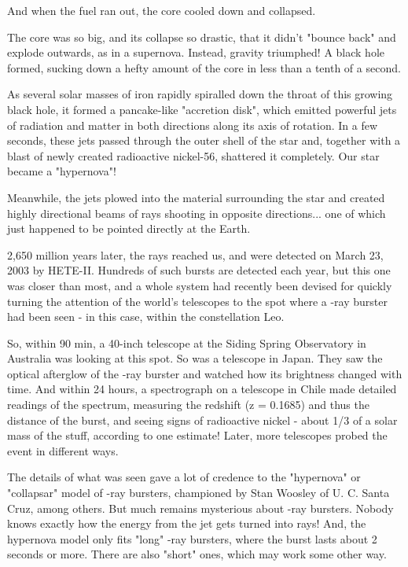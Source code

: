 And when the fuel ran out, the core cooled down and collapsed.  

The core was so big, and its collapse so drastic, that it didn't 
"bounce back" and explode outwards, as in a supernova.  Instead, 
gravity triumphed!  A black hole formed, sucking down a hefty amount 
of the core in less than a tenth of a second.  

As several solar masses of iron rapidly spiralled down the throat of  
this growing black hole, it formed a pancake-like "accretion disk", 
which emitted powerful jets of radiation and matter in both directions
along its axis of rotation.  In a few seconds, these jets passed 
through the outer shell of the star and, together with a blast of 
newly created radioactive nickel-56, shattered it completely.  Our 
star became a "hypernova"!

Meanwhile, the jets plowed into the material surrounding the star
and created highly directional beams of \gamma  rays shooting in opposite
directions... one of which just happened to be pointed directly at
the Earth. 

2,650 million years later, the \gamma  rays reached us, and were
detected on March 23, 2003 by HETE-II.  Hundreds of such bursts are 
detected each year, but this one was closer than most, and a whole 
system had recently been devised for quickly turning the attention 
of the world's telescopes to the spot where a \gamma -ray burster had
been seen - in this case, within the constellation Leo.

So, within 90 min, a 40-inch telescope at the Siding Spring Observatory 
in Australia was looking at this spot.  So was a telescope in Japan. 
They saw the optical afterglow of the \gamma -ray burster and watched
how its brightness changed with time.  And within 24 hours, a spectrograph 
on a telescope in Chile made detailed readings of the spectrum, measuring 
the redshift (z = 0.1685) and thus the distance of the burst, and seeing
signs of radioactive nickel - about 1/3 of a solar mass of the stuff,
according to one estimate!  Later, more telescopes probed the event in
different ways.

The details of what was seen gave a lot of credence to the "hypernova" 
or "collapsar" model of \gamma -ray bursters, championed by Stan Woosley 
of U. C. Santa Cruz, among others.  But much remains mysterious about 
\gamma -ray bursters.  Nobody knows exactly how the energy from the jet 
gets turned into \gamma  rays!  And, the hypernova model only fits "long" 
\gamma -ray bursters, where the burst lasts about 2 seconds or more.  
There are also "short" ones, which may work some other way.

